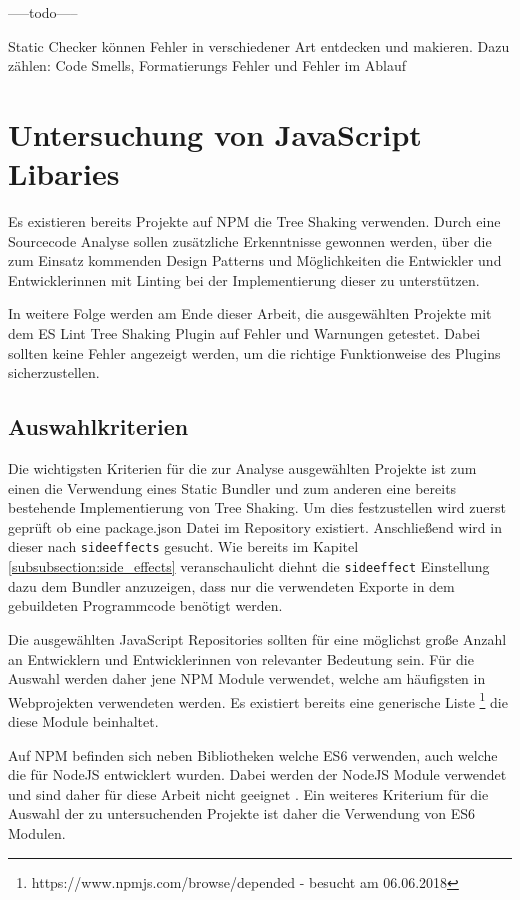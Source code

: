 -----todo-----

Static Checker können Fehler in verschiedener Art entdecken und makieren. Dazu zählen: Code Smells, Formatierungs Fehler und Fehler im Ablauf 

\section{Untersuchung von JavaScript Libaries}
Es existieren bereits Projekte auf NPM die Tree Shaking verwenden. Durch eine Sourcecode Analyse sollen zusätzliche Erkenntnisse gewonnen werden, über die zum Einsatz kommenden Design Patterns und Möglichkeiten die Entwickler und Entwicklerinnen mit Linting bei der Implementierung dieser zu unterstützen.

In weitere Folge werden am Ende dieser Arbeit, die ausgewählten Projekte mit dem ES Lint Tree Shaking Plugin auf Fehler und Warnungen getestet. Dabei sollten keine Fehler angezeigt werden, um die richtige Funktionweise des Plugins sicherzustellen.

\subsection{Auswahlkriterien}
Die wichtigsten Kriterien für die zur Analyse ausgewählten Projekte ist zum einen die Verwendung eines Static Bundler und zum anderen eine bereits bestehende Implementierung von Tree Shaking. Um dies festzustellen wird zuerst geprüft ob eine package.json Datei im Repository existiert. Anschließend wird in dieser nach \lstinline{sideeffects} gesucht. Wie bereits im Kapitel \ref{subsubsection:side_effects} veranschaulicht diehnt die \lstinline{sideeffect} Einstellung dazu dem Bundler anzuzeigen, dass nur die verwendeten Exporte in dem gebuildeten Programmcode benötigt werden.

Die ausgewählten JavaScript Repositories sollten  für eine möglichst große Anzahl an Entwicklern und Entwicklerinnen von relevanter Bedeutung sein. Für die Auswahl werden daher jene NPM Module verwendet, welche am häufigsten in Webprojekten verwendeten werden. Es existiert bereits eine generische Liste \footnote{https://www.npmjs.com/browse/depended - besucht am 06.06.2018} die diese Module beinhaltet.

Auf NPM befinden sich neben Bibliotheken welche ES6 verwenden, auch welche die für NodeJS entwicklert wurden. Dabei werden der NodeJS Module verwendet und sind daher für diese Arbeit nicht geeignet \autocite{NodeJSModules}. Ein weiteres Kriterium für die Auswahl der zu untersuchenden Projekte ist daher die Verwendung von ES6 Modulen.

